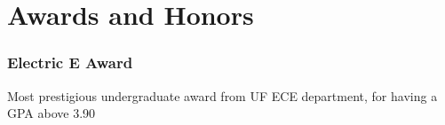 \documentclass{article}
\newcommand{\sectionspacing}{\vspace{-0em}} %
\newenvironment{CustomItemize}
{ \begin{itemize}[leftmargin=1em]
    \setlength{\itemsep}{0pt}
    \setlength{\parskip}{0pt}
    \setlength{\parindent}{0pt}
    \setlength{\parsep}{0pt}     }
{ \end{itemize}                  }
\begin{document}




\sectionspacing{}
\section{Awards and Honors}

\subsubsection{Electric E Award}
Most prestigious undergraduate award from UF ECE department, for having a GPA above 3.90
\end{document}
